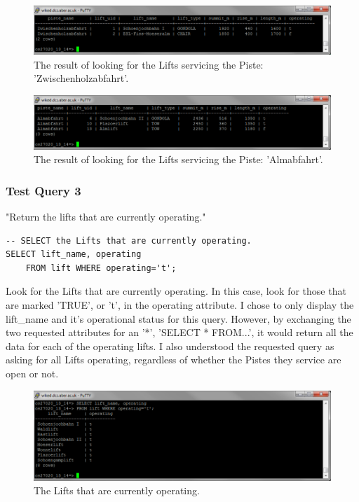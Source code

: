 \documentclass[11pt]{scrartcl} %
\begin{document}
\begin{figure}[H]
  \centering
    \includegraphics[width=1\textwidth]{IMG/query_2_1.png}
 \caption{The result of looking for the Lifts servicing the Piste: 'Zwischenholzabfahrt'.}
\end{figure}

\begin{figure}[H]
  \centering
    \includegraphics[width=1\textwidth]{IMG/query_2_2.png}
 \caption{The result of looking for the Lifts servicing the Piste: 'Almabfahrt'.}
\end{figure}

\subsubsection{Test Query 3}
"Return the lifts that are currently operating."
\begin{lstlisting}
-- SELECT the Lifts that are currently operating.
SELECT lift_name, operating
	FROM lift WHERE operating='t';
\end{lstlisting}
Look for the Lifts that are currently operating. In this case, look for those that are marked 'TRUE', or 't', in the operating attribute. I chose to only display the lift\_name and it's operational status for this query. However, by exchanging the two requested attributes for an '*', 'SELECT * FROM...', it would return all the data for each of the operating lifts. I also understood the requested query as asking for all Lifts operating, regardless of whether the Pistes they service are open or not.

\begin{figure}[H]
  \centering
    \includegraphics[width=1\textwidth]{IMG/query_3_1.png}
 \caption{The Lifts that are currently operating.}
\end{figure}
\end{document}
